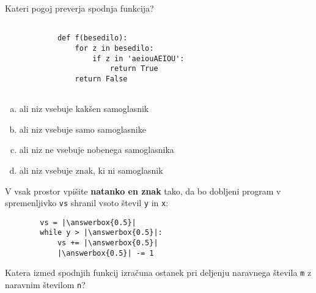 \documentclass[arhiv, 10pt]{../izpit}
\newcommand{\inlinepy}[1]{\texttt{#1}}
\newcommand{\answerbox}[1]{\framebox{\vphantom{\large M}\hspace{#1cm}}}
\begin{document}
        \naloga*

        \begin{multicols}{2}
        \noindent
        Kateri pogoj preverja spodnja funkcija?
        \begin{verbatim}
        
            def f(besedilo):
                for z in besedilo:
                    if z in 'aeiouAEIOU':
                        return True
                return False
            
        \end{verbatim}

        \begin{enumerate}[(a)]
\item ali niz vsebuje kakšen samoglasnik
\item ali niz vsebuje samo samoglasnike
\item ali niz ne vsebuje nobenega samoglasnika
\item ali niz vsebuje znak, ki ni samoglasnik
\end{enumerate}

        \end{multicols}
    
        \naloga*
        \begin{multicols}{2}
        \noindent
        V vsak prostor vpišite \textbf{natanko en znak} tako, da bo dobljeni program v spremenljivko \inlinepy{vs} shranil vsoto števil \inlinepy{y} in \inlinepy{x}:
        
        \columnbreak
        \begin{verbatim}
        vs = |\answerbox{0.5}|
        while y > |\answerbox{0.5}|:
            vs += |\answerbox{0.5}|
            |\answerbox{0.5}| -= 1
        \end{verbatim}
        \end{multicols}
    
        \clearpage
        \naloga
        
        Katera izmed spodnjih funkcij izračuna ostanek pri deljenju naravnega števila \inlinepy{m} z naravnim številom \inlinepy{n}?
    
\end{document}
